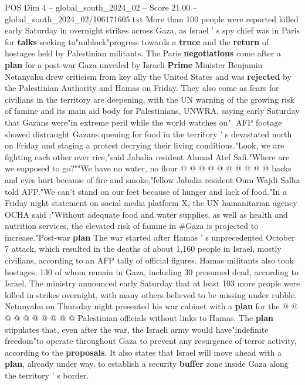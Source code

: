 \begin{textsample}{POS Dim 4 – global\_south\_2024\_02 – Score 21.00 – global\_south\_2024\_02/106171605.txt}  \label{ex:f4_pos_076}
More than 100 people were reported killed early Saturday in overnight strikes across Gaza, as Israel ' s spy chief was in Paris for \textbf{talks} seeking to"unblock"progress towards a \textbf{truce} and the \textbf{return} of hostages held by Palestinian militants.
The Paris \textbf{negotiations} come after a \textbf{plan} for a post-war Gaza unveiled by Israeli \textbf{Prime} Minister Benjamin Netanyahu drew criticism from key ally the United States and was \textbf{rejected} by the Palestinian Authority and Hamas on Friday.
They also come as fears for civilians in the territory are deepening, with the UN warning of the growing risk of famine and its main aid body for Palestinians, UNWRA, saying early Saturday that Gazans were"in extreme peril while the world watches on".
AFP footage showed distraught Gazans queuing for food in the territory ' s devastated north on Friday and staging a protest decrying their living conditions."Look, we are fighting each other over rice,"said Jabalia resident Ahmad Atef Safi."Where are we supposed to go?""We have no water, no flour @ @ @ @ @ @ @ @ @ @ backs and eyes hurt because of fire and smoke,"fellow Jabalia resident Oum Wajdi Salha told AFP."We can't stand on our feet because of hunger and lack of food."In a Friday night statement on social media platform X, the UN humanitarian agency OCHA said :"Without adequate food and water supplies, as well as health and nutrition services, the elevated risk of famine in \#Gaza is projected to increase."Post-war \textbf{plan} The war started after Hamas ' s unprecedented October 7 attack, which resulted in the deaths of about 1,160 people in Israel, mostly civilians, according to an AFP tally of official figures.
Hamas militants also took hostages, 130 of whom remain in Gaza, including 30 presumed dead, according to Israel.
The ministry announced early Saturday that at least 103 more people were killed in strikes overnight, with many others believed to be missing under rubble.
Netanyahu on Thursday night presented his war cabinet with a \textbf{plan} for the @ @ @ @ @ @ @ @ @ @ Palestinian officials without links to Hamas.
The \textbf{plan} stipulates that, even after the war, the Israeli army would have"indefinite freedom"to operate throughout Gaza to prevent any resurgence of terror activity, according to the \textbf{proposals}.
It also states that Israel will move ahead with a \textbf{plan}, already under way, to establish a security \textbf{buffer} zone inside Gaza along the territory ' s border.

\end{textsample}

